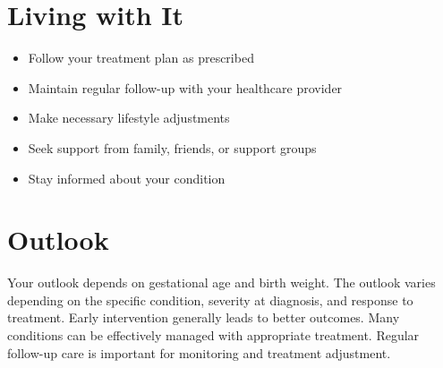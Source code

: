 \section{Living with It}
\begin{itemize}[noitemsep]
  \item Follow your treatment plan as prescribed
  \item Maintain regular follow-up with your healthcare provider
  \item Make necessary lifestyle adjustments
  \item Seek support from family, friends, or support groups
  \item Stay informed about your condition
\end{itemize}
\section{Outlook}
Your outlook depends on gestational age and birth weight. The outlook varies depending on the specific condition, severity at diagnosis, and response to treatment. Early intervention generally leads to better outcomes. Many conditions can be effectively managed with appropriate treatment. Regular follow-up care is important for monitoring and treatment adjustment.
